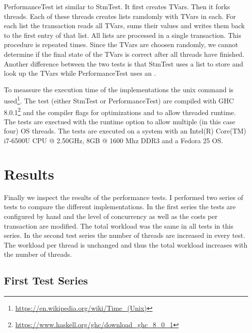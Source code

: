 PerformanceTest ist similar to StmTest. It first creates  TVars. Then it forks  threads. Each of these 
threads creates  lists ramdomly with  TVars in each. For each list the transaction reads all TVars,
sums their values and writes them back to the first entry of that list. All lists are processed in a single transaction. 
This procedure is repeated  times. Since the TVars are choosen randomly, we cannot determine if the final state
of the TVars is correct after all threads have finished. Another difference between the two tests is that StmTest uses a list to 
store and look up the TVars while PerformanceTest uses an .

To meassure the execution time of the implementations the unix  command is used\footnote{\url{https://en.wikipedia.org/wiki/Time_(Unix)}}.
The test (either StmTest or PerformanceTest) are compiled with GHC 8.0.1\footnote{\url{https://www.haskell.org/ghc/download_ghc_8_0_1}} and the 
compiler flags  for optimizations and  to allow threaded runtime. The tests are exectued with the runtime option  
to allow multiple (in this case four) OS threads. The tests are executed on a system with an Intel(R) Core(TM) i7-6500U CPU @ 2.50GHz,
8GB @ 1600 Mhz DDR3 and a Fedora 25 OS. 


\section{Results}
Finally we inspect the results of the performance tests. I performed two series of tests to compare the different implementations.
In the first series the tests are configured by hand and the level of concurrency as well as the costs per transaction are modified.
The total workload was the same in all tests in this series. In the second test series the number of threads are increased in every
test. The workload per thread is unchanged and thus the total workload increases with the number of threads. 

\subsection{First Test Series}

